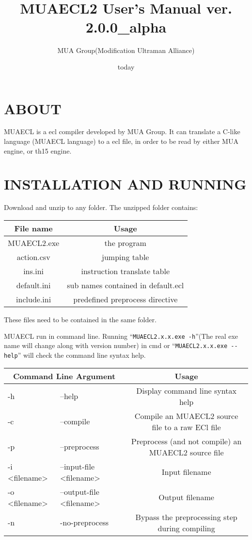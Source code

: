 \documentclass{article}
\author{MUA Group(Modification Ultraman Alliance)}
\title{MUAECL2 User's Manual  ver. 2.0.0\_alpha}
\date{today}
\begin{document}
\maketitle
\tableofcontents
\clearpage

\section{ABOUT}

MUAECL is a ecl compiler developed by MUA Group. It can translate a C-like language (MUAECL language) to a ecl file, in order to be read by either MUA engine, or th15 engine.

\section{INSTALLATION AND RUNNING}

Download and unzip to any folder. The unzipped folder contains:

\begin{table}[H]
	\centering
	\begin{tabular}{c|c}
		\hline
		File name & Usage \\\hline
		MUAECL2.exe & the program \\\hline
		action.csv & jumping table \\\hline
		ins.ini & instruction translate table \\\hline
		default.ini & sub names contained in default.ecl \\\hline
		include.ini & predefined preprocess directive \\\hline
	\end{tabular}
\end{table}

These files need to be contained in the same folder.

MUAECL run in command line. Running ``\verb|MUAECL2.x.x.exe -h|''(The real exe name will change along with version number) in cmd or ``\verb|MUAECL2.x.x.exe --help|'' will check the command line syntax help.

\begin{table}[H]
	\centering
	\begin{tabular}{l|l|c}
		\hline
		\multicolumn{2}{c|}{Command Line Argument} & Usage \\\hline
		-h & --help & Display command line syntax help \\\hline
		-c & --compile & Compile an MUAECL2 source file to a raw ECl file \\\hline
		-p & --preprocess & Preprocess (and not compile) an MUAECL2 source file \\\hline
		-i <filename> & --input-file <filename> & Input filename \\\hline
		-o <filename> & --output-file <filename> & Output filename \\\hline
		-n & -no-preprocess & Bypass the preprocessing step during compiling \\\hline
	\end{tabular}
\end{table}
\end{document}
